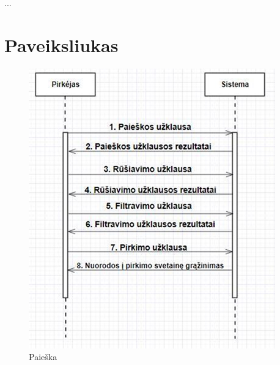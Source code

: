 \documentclass{VUMIFPSkursinis}
\begin{document}
...

\printbibliography[heading=bibintoc]  %

\appendix  %

\section{Paveiksliukas}
\begin{figure}[H]
  \centering
  \includegraphics[scale=1]{img/paieska1}
  \caption{Paieška}
  \label{paieska}
\end{figure}
\end{document}
